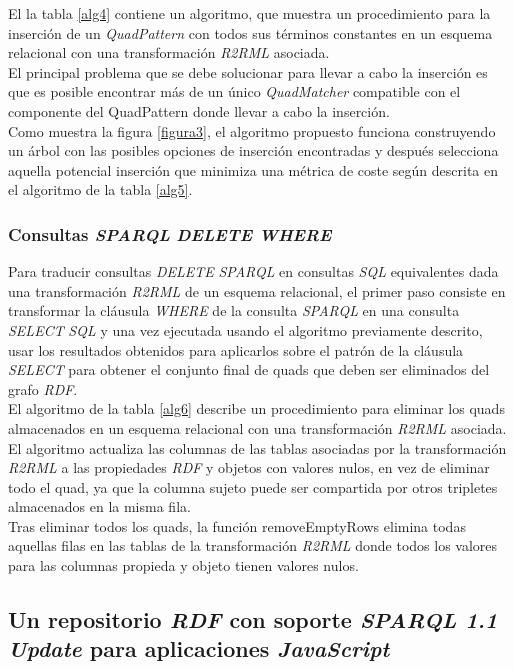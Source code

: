 El la tabla \ref{alg4} contiene un algoritmo, que  muestra un procedimiento para la inserci\'on de un \textit{QuadPattern} con todos sus t\'erminos constantes en un esquema relacional con una transformaci\'on \textit{R2RML} asociada.\\
El principal problema que se debe solucionar para llevar a cabo la inserci\'on es que es posible encontrar m\'as de un \'unico \textit{QuadMatcher} compatible con el componente del QuadPattern donde llevar a cabo la inserci\'on.\\
Como muestra la figura \ref{figura3}, el algoritmo propuesto funciona construyendo un \'arbol con las posibles opciones de inserci\'on encontradas y despu\'es selecciona aquella potencial inserci\'on que minimiza una m\'etrica de coste seg\'un descrita en el algoritmo de la tabla \ref{alg5}.


\subsubsection{Consultas \textit{SPARQL} \textit{DELETE WHERE}}

Para traducir consultas \textit{DELETE} \textit{SPARQL} en consultas \textit{SQL} equivalentes dada una transformaci\'on \textit{R2RML} de un esquema relacional, el primer paso consiste en transformar la cl\'ausula \textit{WHERE} de la consulta \textit{SPARQL} en una consulta \textit{SELECT} \textit{SQL} y una vez ejecutada usando el algoritmo previamente descrito, usar los resultados obtenidos para aplicarlos sobre el patr\'on de la cl\'ausula \textit{SELECT} para obtener el conjunto final de quads que deben ser eliminados del grafo \textit{RDF}.\\
El algoritmo de la tabla \ref{alg6} describe un procedimiento para eliminar los quads almacenados en un esquema relacional con una transformaci\'on \textit{R2RML} asociada. El algoritmo actualiza las columnas de las tablas asociadas por la transformaci\'on \textit{R2RML} a las propiedades \textit{RDF} y objetos con valores nulos, en vez de eliminar todo el quad, ya que la columna sujeto puede ser compartida por otros tripletes almacenados en la misma fila.\\
Tras eliminar todos los quads, la funci\'on removeEmptyRows elimina todas aquellas filas en las tablas de la transformaci\'on \textit{R2RML} donde todos los valores para las columnas propieda y objeto tienen valores nulos.

\subsection{Un repositorio \textit{RDF} con soporte \textit{SPARQL 1.1 Update} para aplicaciones \textit{JavaScript}}

